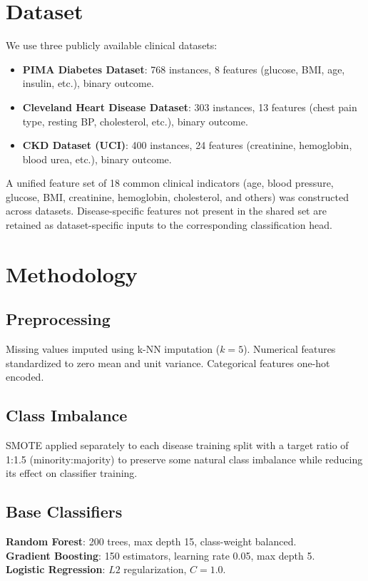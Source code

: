 \documentclass[conference]{IEEEtran}
\begin{document}
\section{Dataset}

We use three publicly available clinical datasets:
\begin{itemize}
\item \textbf{PIMA Diabetes Dataset}: 768 instances, 8 features (glucose, BMI, age, insulin, etc.), binary outcome.
\item \textbf{Cleveland Heart Disease Dataset}: 303 instances, 13 features (chest pain type, resting BP, cholesterol, etc.), binary outcome.
\item \textbf{CKD Dataset (UCI)}: 400 instances, 24 features (creatinine, hemoglobin, blood urea, etc.), binary outcome.
\end{itemize}

A unified feature set of 18 common clinical indicators (age, blood pressure, glucose, BMI, creatinine, hemoglobin, cholesterol, and others) was constructed across datasets. Disease-specific features not present in the shared set are retained as dataset-specific inputs to the corresponding classification head.

\section{Methodology}

\subsection{Preprocessing}
Missing values imputed using k-NN imputation ($k=5$). Numerical features standardized to zero mean and unit variance. Categorical features one-hot encoded.

\subsection{Class Imbalance}
SMOTE \cite{chawla2002smote} applied separately to each disease training split with a target ratio of 1:1.5 (minority:majority) to preserve some natural class imbalance while reducing its effect on classifier training.

\subsection{Base Classifiers}
\textbf{Random Forest}: 200 trees, max depth 15, class-weight balanced.\\
\textbf{Gradient Boosting}: 150 estimators, learning rate 0.05, max depth 5.\\
\textbf{Logistic Regression}: $L2$ regularization, $C=1.0$.
\end{document}
